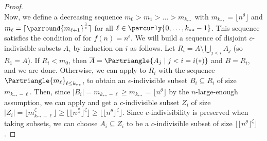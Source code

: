 \begin{theorem}[Theorem 4.23]
\begin{proof}
\[            \]
            Now, we define a decreasing sequence $m_0 > m_1 > \dots > m_{k_{**}}$ with $m_{k_{**}} = \lfloor n^\theta \rfloor$
            and $m_{\ell} = \lceil \parround{m_{\ell+1}}^{\frac{1}{\epsilon}} \rceil$ for all $\ell \in \parcurly{0, \dots, k_{**}-1}$.
            This sequence satisfies the condition of  for $f(n) = n^\epsilon$.
            We will build a sequence of disjoint $c$-indivisible subsets $A_i$ by induction on $i$ as follows.
            Let $R_i = A \setminus \bigcup_{j<i} A_j$ (so $R_1 = A$).
            If $R_i < m_0$, then
            $\overline{A} = \Partriangle{A_j \mid j < i = i(*)}$ and $B = R_i$, and we are done.
            Otherwise, we can apply  to $R_i$ with the sequence
            $\Partriangle{m_\ell}_{\ell \leq k_{**}}$, to obtain an $\epsilon$-indivisible subset $B_i \subseteq R_i$ of
            size $m_{k_{**}-\ell}$.
            Then, since $|B_i| = m_{k_{**}-\ell} \geq m_{k_{**}} = \lfloor n^\theta \rfloor$ by the $n$-large-enough assumption,
            we can apply  and get a
            $c$-indivisible subset $Z_i$ of size $|Z_i| = \lfloor m_{k_{**}-\ell}^\zeta \rfloor
            \geq \lfloor \lfloor n^{\frac{\theta}{\epsilon^\ell}} \rfloor ^\zeta \rfloor
            \geq \lfloor \lfloor n^{\theta} \rfloor ^\zeta \rfloor$.
            Since $c$-indivisibility is preserved when taking subsets,
            we can choose $A_i \subseteq Z_i$ to be a $c$-indivisible subset of size $\lfloor \lfloor n^{\theta} \rfloor ^\zeta \rfloor$.
        \end{proof}
    \end{theorem}













